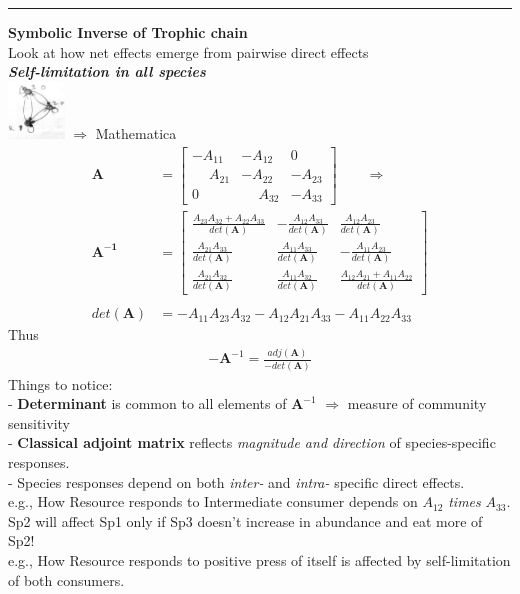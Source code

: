 \documentclass{article}
\newcommand{\ind}{\-\hspace{1cm}}
\begin{document}
\rule[0.5ex]{\linewidth}{1pt}
\textbf{Symbolic Inverse of Trophic chain}\\
\ind Look at how net effects emerge from pairwise direct effects\\
\emph{\textbf{Self-limitation in all species}}\\
\includegraphics[width=1.5cm]{figs/IGP_full.pdf}
 $\Rightarrow$ Mathematica
\begin{align*}
	\mathbf{A}&=\begin{bmatrix} -A_{11} & -A_{12} & 0 \\ \phantom{-}A_{21} & -A_{22} & -A_{23} \\ 0 & \phantom{-}A_{32} & -A_{33} \end{bmatrix} \qquad \Rightarrow \qquad \\
	\mathbf{A^{-1}}&=
	\begin{bmatrix}
 \frac{A_{23} A_{32}+A_{22} A_{33}}{det(\mathbf{A})} & -\frac{A_{12} A_{33}}{det(\mathbf{A})} & \frac{A_{12} A_{23}}{det(\mathbf{A})} \\
 \frac{A_{21} A_{33}}{det(\mathbf{A})} & \frac{A_{11} A_{33}}{det(\mathbf{A})} & -\frac{A_{11} A_{23}}{det(\mathbf{A})} \\
 \frac{A_{21} A_{32}}{det(\mathbf{A})} & \frac{A_{11} A_{32}}{det(\mathbf{A})} & \frac{A_{12} A_{21}+A_{11} A_{22}}{det(\mathbf{A})}\end{bmatrix}\\
 \\
 det(\mathbf{A})&=-A_{11} A_{23} A_{32}-A_{12} A_{21} A_{33}-A_{11} A_{22} A_{33}
\end{align*}
Thus
\begin{align*}
	-\mathbf{A}^{-1}=\frac{adj(\mathbf{A})}{-det(\mathbf{A})}
\end{align*}
Things to notice:\\
\ind - \textbf{Determinant} is common to all elements of $\mathbf{A}^{-1}$ $\Rightarrow$ measure of community sensitivity\\
\ind - \textbf{Classical adjoint matrix} reflects \emph{magnitude and direction} of species-specific responses.\\
\ind - Species responses depend on both \emph{inter-} and \emph{intra-} specific direct effects.\\

\ind e.g., How Resource responds to Intermediate consumer depends on  $A_{12}$ \emph{times} $A_{33}$.\\
\ind \ind \ind Sp2 will affect Sp1 only if Sp3 doesn't increase in abundance and eat more of Sp2!\\
\ind e.g., How Resource responds to positive press of itself is affected by self-limitation of both consumers.
\end{document}
